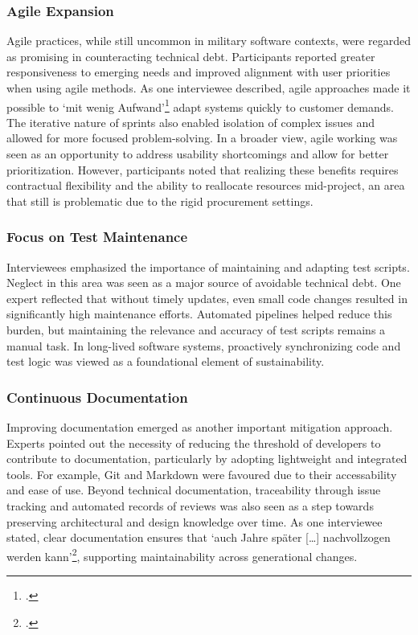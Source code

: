 \subsubsection{Agile Expansion}
Agile practices, while still uncommon in military software contexts, were regarded as promising in counteracting technical debt. Participants reported greater responsiveness to emerging needs and improved alignment with user priorities when using agile methods.
As one interviewee described, agile approaches made it possible to `mit wenig Aufwand'\footcite{interview3} adapt systems quickly to customer demands. The iterative nature of sprints also enabled isolation of complex issues and allowed for more focused problem-solving.
In a broader view, agile working was seen as an opportunity to address usability shortcomings and allow for better prioritization. However, participants noted that realizing these benefits requires contractual flexibility and the ability to reallocate resources mid-project, an area that still is problematic due to the rigid procurement settings.\\

\subsubsection{Focus on Test Maintenance}
Interviewees emphasized the importance of maintaining and adapting test scripts. Neglect in this area was seen as a major source of avoidable technical debt. One expert reflected that without timely updates, even small code changes resulted in significantly high maintenance efforts.
Automated pipelines helped reduce this burden, but maintaining the relevance and accuracy of test scripts remains a manual task. In long-lived software systems, proactively synchronizing code and test logic was viewed as a foundational element of sustainability.\\

\subsubsection{Continuous Documentation}
Improving documentation emerged as another important mitigation approach. Experts pointed out the necessity of reducing the threshold of developers to contribute to documentation, particularly by adopting lightweight and integrated tools. For example, Git and Markdown were favoured due to their accessability and ease of use.
Beyond technical documentation, traceability through issue tracking and automated records of reviews was also seen as a step towards preserving architectural and design knowledge over time. As one interviewee stated, clear documentation ensures that `auch Jahre später [\ldots] nachvollzogen werden kann'\footcite{interview2}, supporting maintainability across generational changes.\\

